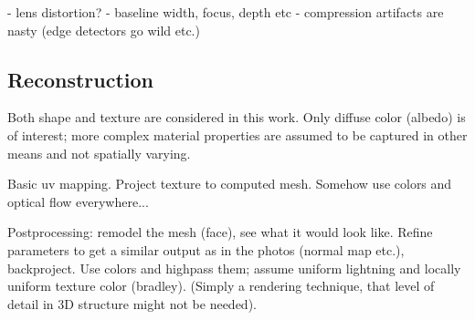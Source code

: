 - lens distortion?
- baseline width, focus, depth etc
- compression artifacts are nasty (edge detectors go wild etc.)


\subsection{Reconstruction}

Both shape and texture are considered in this work. Only diffuse color (albedo) is of interest; more complex material properties are assumed to be captured in other means and not spatially varying.

Basic uv mapping. Project texture to computed mesh. Somehow use colors and optical flow everywhere...

Postprocessing: remodel the mesh (face), see what it would look like. Refine parameters to get a similar output as in the photos (normal map etc.), backproject. Use colors and highpass them; assume uniform lightning and locally uniform texture color (bradley). (Simply a rendering technique, that level of detail in 3D structure might not be needed).

